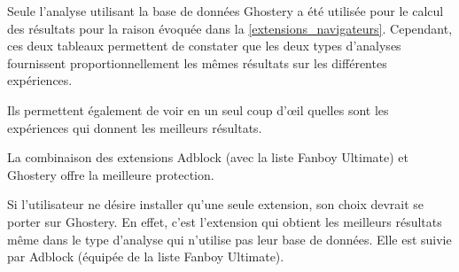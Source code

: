 Seule l'analyse utilisant la base de données Ghostery a été utilisée pour le calcul des résultats pour la raison évoquée dans la \autoref{extensions_navigateurs}. Cependant, ces deux tableaux permettent de constater que les deux types d'analyses fournissent proportionnellement les mêmes résultats sur les différentes expériences.
\newline

Ils permettent également de voir en un seul coup d'\oe{}il quelles sont les expériences qui donnent les meilleurs résultats.

La combinaison des extensions Adblock (avec la liste Fanboy Ultimate) et Ghostery offre la meilleure protection.

Si l'utilisateur ne désire installer qu'une seule extension, son choix devrait se porter sur Ghostery.
En effet, c'est l'extension qui obtient les meilleurs résultats même dans le type d'analyse qui n'utilise pas leur base de données. Elle est suivie par Adblock (équipée de la liste Fanboy Ultimate).

